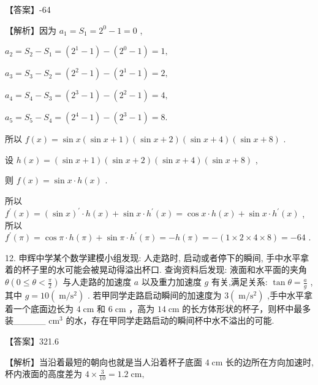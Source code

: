 \documentclass[10pt]{article}
\begin{document}
【答案】-64

【解析】因为 \({a}_{1} = {S}_{1} = {2}^{0} - 1 = 0\) ,

\({a}_{2} = {S}_{2} - {S}_{1} = \left( {{2}^{1} - 1}\right)  - \left( {{2}^{0} - 1}\right)  = 1,\)

\({a}_{3} = {S}_{3} - {S}_{2} = \left( {{2}^{2} - 1}\right)  - \left( {{2}^{1} - 1}\right)  = 2,\)

\({a}_{4} = {S}_{4} - {S}_{3} = \left( {{2}^{3} - 1}\right)  - \left( {{2}^{2} - 1}\right)  = 4,\)

\({a}_{5} = {S}_{5} - {S}_{4} = \left( {{2}^{4} - 1}\right)  - \left( {{2}^{3} - 1}\right)  = 8.\)

所以 \(f\left( x\right)  = \sin x\left( {\sin x + 1}\right) \left( {\sin x + 2}\right) \left( {\sin x + 4}\right) \left( {\sin x + 8}\right)\) .

设 \(h\left( x\right)  = \left( {\sin x + 1}\right) \left( {\sin x + 2}\right) \left( {\sin x + 4}\right) \left( {\sin x + 8}\right)\) ,

则 \(f\left( x\right)  = \sin x \cdot  h\left( x\right)\) .

所以 \({f}^{\prime }\left( x\right)  = {\left( \sin x\right) }^{\prime } \cdot  h\left( x\right)  + \sin x \cdot  {h}^{\prime }\left( x\right)  = \cos x \cdot  h\left( x\right)  + \sin x \cdot  {h}^{\prime }\left( x\right)\) , 所以 \({f}^{\prime }\left( \pi \right)  = \cos \pi  \cdot  h\left( \pi \right)  + \sin \pi  \cdot  {h}^{\prime }\left( \pi \right)  =  - h\left( \pi \right)  =  - \left( {1 \times  2 \times  4 \times  8}\right)  =  - {64}\) .

12. 申辉中学某个数学建模小组发现: 人走路时, 启动或者停下的瞬间, 手中水平拿着的杯子里的水可能会被晃动得溢出杯口. 查询资料后发现: 液面和水平面的夹角 \(\theta \left( {0 \leq  \theta  < \frac{\pi }{2}}\right)\) 与人走路的加速度 \(a\) 以及重力加速度 \(g\) 有关,满足关系: \(\tan \theta  = \frac{a}{g}\) ,其中 \(g = {10}\left( {\mathrm{\;m}/{\mathrm{s}}^{2}}\right)\) . 若甲同学走路启动瞬间的加速度为 \(3\left( {\mathrm{\;m}/{\mathrm{s}}^{2}}\right)\) ,手中水平拿着一个底面边长为 \(4\mathrm{\;{cm}}\) 和 \(6\mathrm{\;{cm}}\) ，高为 \({14}\mathrm{\;{cm}}\) 的长方体形状的杯子，则杯中最多装\_\_\_\_\_ \({\mathrm{{cm}}}^{3}\) 的水，存在甲同学走路启动的瞬间杯中水不溢出的可能.

【答案】321.6

【解析】当沿着最短的朝向也就是当人沿着杯子底面 \(4\mathrm{\;{cm}}\) 长的边所在方向加速时,杯内液面的高度差为 \(4 \times  \frac{3}{10} = {1.2}\mathrm{\;{cm}},\)
\end{document}
